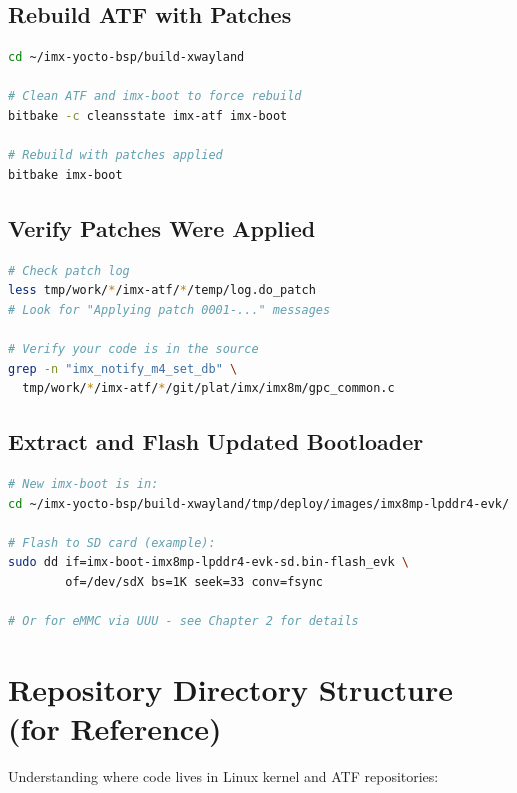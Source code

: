 \documentclass[12pt,a4paper]{report}
\begin{document}
\subsection{Rebuild ATF with Patches}

\begin{lstlisting}[language=bash]
cd ~/imx-yocto-bsp/build-xwayland

# Clean ATF and imx-boot to force rebuild
bitbake -c cleansstate imx-atf imx-boot

# Rebuild with patches applied
bitbake imx-boot
\end{lstlisting}

\subsection{Verify Patches Were Applied}

\begin{lstlisting}[language=bash]
# Check patch log
less tmp/work/*/imx-atf/*/temp/log.do_patch
# Look for "Applying patch 0001-..." messages

# Verify your code is in the source
grep -n "imx_notify_m4_set_db" \
  tmp/work/*/imx-atf/*/git/plat/imx/imx8m/gpc_common.c
\end{lstlisting}

\subsection{Extract and Flash Updated Bootloader}

\begin{lstlisting}[language=bash]
# New imx-boot is in:
cd ~/imx-yocto-bsp/build-xwayland/tmp/deploy/images/imx8mp-lpddr4-evk/

# Flash to SD card (example):
sudo dd if=imx-boot-imx8mp-lpddr4-evk-sd.bin-flash_evk \
        of=/dev/sdX bs=1K seek=33 conv=fsync

# Or for eMMC via UUU - see Chapter 2 for details
\end{lstlisting}

\section{Repository Directory Structure (for Reference)}

Understanding where code lives in Linux kernel and ATF repositories:
\end{document}
